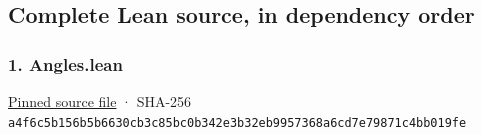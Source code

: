 \documentclass[11pt,a4paper]{article}
\begin{document}
\subsection{Complete Lean source, in dependency order}\label{complete-lean-source-in-dependency-order}

\subsubsection{1. Angles.lean}\label{angles.lean}

\href{https://github.com/mpelteshki/climbing-to-the-frontier/blob/29fbb70da18564048f62492e43870f2f96a65463/cagent/p1/Angles.lean}{Pinned source file} · SHA-256 \texttt{a4f6c5b1\allowbreak{}56b5b663\allowbreak{}0cb3c85b\allowbreak{}c0b342e3\allowbreak{}b32eb995\allowbreak{}7368a6cd\allowbreak{}7e79871c\allowbreak{}4bb019fe}
\end{document}

